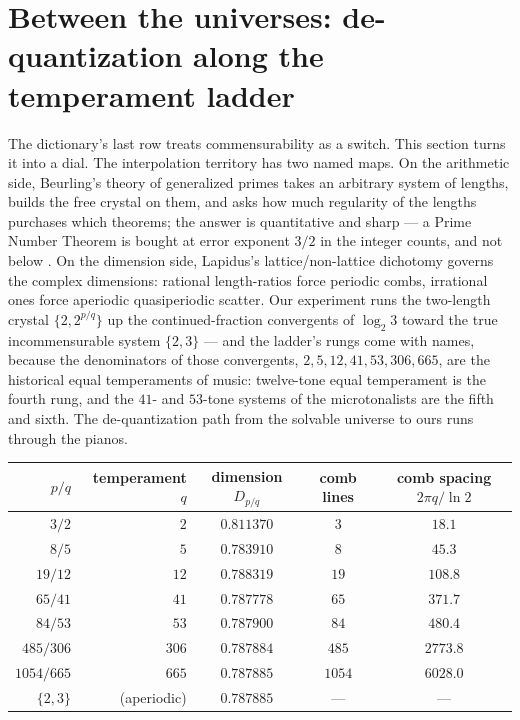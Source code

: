 \documentclass[11pt]{article}
\theoremstyle{remark}
\begin{document}
\section{Between the universes: de-quantization along the temperament ladder}

The dictionary's last row treats commensurability as a switch. This section turns it into a dial. The
interpolation territory has two named maps. On the arithmetic side, Beurling's theory of generalized
primes \cite{Beurling, DiamondZhang} takes an arbitrary system of lengths, builds the free crystal on
them, and asks how much regularity of the lengths purchases which theorems; the answer is
quantitative and sharp --- a Prime Number Theorem is bought at error exponent $3/2$ in the integer
counts, and not below \cite{DMV}. On the dimension side, Lapidus's lattice/non-lattice dichotomy
\cite{LapidusBook} governs the complex dimensions: rational length-ratios force periodic combs,
irrational ones force aperiodic quasiperiodic scatter. Our experiment runs the two-length crystal
$\{2, 2^{p/q}\}$ up the continued-fraction convergents of $\log_2 3$ toward the true incommensurable
system $\{2, 3\}$ --- and the ladder's rungs come with names, because the denominators of those
convergents, $2, 5, 12, 41, 53, 306, 665$, are the historical equal temperaments of music:
twelve-tone equal temperament is the fourth rung, and the $41$- and $53$-tone systems of the
microtonalists are the fifth and sixth. The de-quantization path from the solvable universe to ours
runs through the pianos.

\begin{center}\small
\begin{tabular}{rrccc}
\hline
$p/q$ & temperament $q$ & dimension $D_{p/q}$ & comb lines & comb spacing $2\pi q/\ln 2$ \\
\hline
$3/2$ & $2$ & $0.811370$ & $3$ & $18.1$ \\
$8/5$ & $5$ & $0.783910$ & $8$ & $45.3$ \\
$19/12$ & $12$ & $0.788319$ & $19$ & $108.8$ \\
$65/41$ & $41$ & $0.787778$ & $65$ & $371.7$ \\
$84/53$ & $53$ & $0.787900$ & $84$ & $480.4$ \\
$485/306$ & $306$ & $0.787884$ & $485$ & $2773.8$ \\
$1054/665$ & $665$ & $0.787885$ & $1054$ & $6028.0$ \\
$\{2,3\}$ & (aperiodic) & $0.787885$ & --- & --- \\
\hline
\end{tabular}
\end{center}
\end{document}
